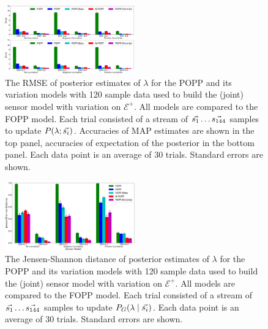\begin{figure}[t!]
	\centering
	\includegraphics[width=0.5\textwidth]{./figures/tjpr_comparison_120.png}
    \caption{The RMSE of posterior estimates of $\lambda$ for the POPP and its variation models with 120 sample data used to build the (joint) sensor model with variation on $\mathcal{E^+}$. All models are compared to the FOPP model. Each trial consisted of a stream of $\protect\vec{s_1} \ldots \protect\vec{s_{144}}$ samples to update $P(\lambda ; \protect\vec{s_i})$. Accuracies of MAP estimates are shown in the top panel, accuracies of expectation of the posterior in the bottom panel. Each data point is an average of 30 trials. Standard errors are shown.} 
	\label{fig:tjpr_comparison_120}
\end{figure}

\begin{figure}[t!]
	\centering
	\includegraphics[width=0.5\textwidth]{./figures/tjpr_comparison_120_kl.png}
	\caption{The Jensen-Shannon distance of posterior estimates of $\lambda$ for the POPP and its variation models with 120 sample data used to build the (joint) sensor model with variation on $\mathcal{E^+}$. All models are compared to the FOPP model. Each trial consisted of a stream of $\protect\vec{s_1} \ldots \protect\vec{s_{144}}$ samples to update $P_G(\lambda \mid \protect\vec{s_i})$. Each data point is an average of 30 trials. Standard errors are shown.} 
	\label{fig:tjpr_comparison_120_kl}
\end{figure}


